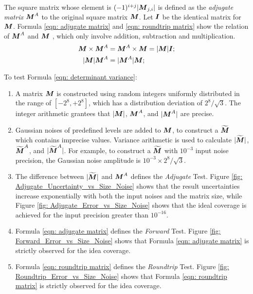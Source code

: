\documentclass[twoside]{article}
\numberwithin{equation}{section}
\begin{document}
The square matrix whose element is $(-1)^{i+j}|\protect{\textrm{\boldmath $M$}}_{j,i}|$ is defined as the \emph{adjugate matrix} \cite{Linear_Algebra} $\protect{\textrm{\boldmath $M$}}^A$ to the original square matrix $\protect{\textrm{\boldmath $M$}}$.
Let $\protect{\textrm{\boldmath $I$}}$ be the identical matrix for $\protect{\textrm{\boldmath $M$}}$.
Formula \eqref{eqn: adjugate matrix} and \eqref{eqn: roundtrip matrix} show the relation of $\protect{\textrm{\boldmath $M$}}^A$ and $\protect{\textrm{\boldmath $M$}}$ \cite{Linear_Algebra}, which only involve addition, subtraction and multiplication.
\begin{align}
\label{eqn: adjugate matrix}
\protect{\textrm{\boldmath $M$}} \times \protect{\textrm{\boldmath $M$}}^A &= \protect{\textrm{\boldmath $M$}}^A \times \protect{\textrm{\boldmath $M$}} = |\protect{\textrm{\boldmath $M$}}| \protect{\textrm{\boldmath $I$}}; \\
\label{eqn: roundtrip matrix}
|\protect{\textrm{\boldmath $M$}}| \protect{\textrm{\boldmath $M$}}^A &=|\protect{\textrm{\boldmath $M$}}^A| \protect{\textrm{\boldmath $M$}};
\end{align}

To test Formula \eqref{eqn: determinant variance}:
\begin{enumerate}
\item A matrix $\protect{\textrm{\boldmath $M$}}$ is constructed using random integers uniformly distributed in the range of $[-2^8, +2^8]$, which has a distribution deviation of $2^8/\sqrt{3}$.
The integer arithmetic grantees that $|\protect{\textrm{\boldmath $M$}}|$, $\protect{\textrm{\boldmath $M$}}^A$, and $|\protect{\textrm{\boldmath $M$}}^A|$ are precise.

\item Gaussian noises of predefined levels are added to $\protect{\textrm{\boldmath $M$}}$, to construct a $\widetilde{\protect{\textrm{\boldmath $M$}}}$ which contains imprecise values.
Variance arithmetic is used to calculate $|\widetilde{\protect{\textrm{\boldmath $M$}}}|$, $\widetilde{\protect{\textrm{\boldmath $M$}}}^A$, and $|\widetilde{\protect{\textrm{\boldmath $M$}}}^A|$.
For example, to construct a $\widetilde{\protect{\textrm{\boldmath $M$}}}$ with $10^{-3}$ input noise precision, the Gaussian noise amplitude is $10^{-3} \times 2^8/\sqrt{3}$.

\item The difference between $|\widetilde{\protect{\textrm{\boldmath $M$}}}|$ and $\protect{\textrm{\boldmath $M$}}^A$ defines the \emph{Adjugate} Test.
Figure \ref{fig: Adjugate_Uncertainty_vs_Size_Noise} shows that the result uncertainties increase exponentially with both the input noises and the matrix size, while Figure \ref{fig: Adjugate_Error_vs_Size_Noise} shows that the ideal coverage is achieved for the input precision greater than $10^{-16}$.

\item Formula \eqref{eqn: adjugate matrix} defines the \emph{Forward} Test.
Figure \ref{fig: Forward_Error_vs_Size_Noise} shows that Formula \eqref{eqn: adjugate matrix} is strictly observed for the idea coverage.

\item Formula \eqref{eqn: roundtrip  matrix} defines the \emph{Roundtrip} Test.
Figure \ref{fig: Roundtrip_Error_vs_Size_Noise} shows that Formula \eqref{eqn: roundtrip matrix} is strictly observed for the idea coverage.

\end{enumerate}
\end{document}
